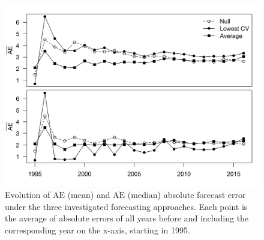 \documentclass[12pt,]{book}
\theoremstyle{definition}
\theoremstyle{definition}
\theoremstyle{definition}
\theoremstyle{remark}
\begin{document}
\begin{figure}
  \centering
  \includegraphics{img/Ch2/ae-changes.png}
  \caption{Evolution of $\overline{\text{AE}}$ (mean) and  $\overline{\text{AE}}$ (median) absolute forecast error under the three investigated forecasting approaches. Each point is the average of absolute errors of all years before and including the corresponding year on the x-axis, starting in 1995.}
  \label{fig:ae-changes}
\end{figure}

\pagebreak
\end{document}
